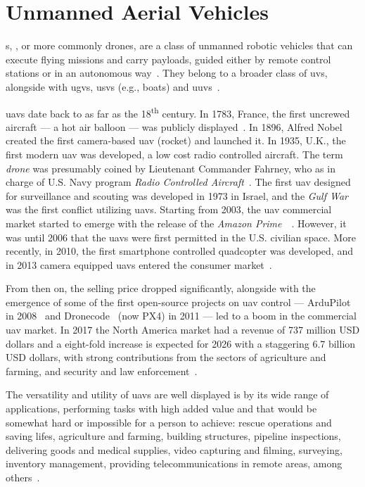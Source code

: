 \section{Unmanned Aerial Vehicles}%
\label{sec:unmann-aeri-vehicl}
s, , or more commonly drones, are a class of
unmanned robotic vehicles that can execute flying missions and carry payloads,
guided either by remote control stations or in an autonomous
way~\cite{alladi2022UAVBlockain,glossner2021overview}.
They belong to a broader class of \glspl{uv}, alongside with \glspl{ugv}, \glspl{usv}
(e.g., boats) and \glspl{uuv}~\cite{glossner2021overview}.

\glspl{uav} date back to as far as the 18\textsuperscript{th} century. In 1783,
France, the first uncrewed aircraft --- a hot air balloon ---
was publicly displayed~\cite{Blundell2020,alladi2022UAVBlockain}. In 1896, Alfred Nobel created the first camera-based \gls{uav}
(rocket) and launched it. In 1935, U.K., the first modern \gls{uav} was
developed, a low cost radio controlled aircraft. The term \emph{drone} was
presumably coined by Lieutenant Commander Fahrney, who as in charge of U.S. Navy
program \emph{Radio Controlled Aircraft}~\cite{Blundell2020}. The first \gls{uav} designed for
surveillance and scouting was developed in 1973 in Israel, and the \emph{Gulf
  War} was the first conflict utilizing \glspl{uav}. Starting from 2003,
the \gls{uav} commercial market started to emerge with the release of the
\emph{Amazon Prime}~~\cite{alladi2022UAVBlockain}.
However, it was until 2006 that the \glspl{uav} were first
permitted in the U.S. civilian space. More recently, in 2010, the first
smartphone controlled quadcopter was developed, and in 2013 camera equipped
\glspl{uav} entered the consumer market~\cite{uavHistory}.

From then on, the selling price dropped significantly, alongside with the
emergence of some of the first open-source projects on \gls{uav} control ---
ArduPilot in 2008~\cite{arduPilotHistory} and Dronecode~\cite{px4History} (now PX4) in 2011 --- led to a boom in the
commercial \gls{uav} market. In 2017 the North America market had a revenue of
737 million USD dollars and a eight-fold increase is expected for 2026 with a
staggering 6.7 billion USD dollars, with strong contributions from the sectors
of agriculture and farming, and security and law enforcement~\cite{mohsan2022towards}.

The versatility and utility of \glspl{uav} are well displayed is by its wide
range of applications, performing tasks with high added value and that would be
somewhat hard or impossible for a person to achieve: rescue operations and
saving lifes, agriculture and farming, building structures, pipeline
inspections, delivering goods and medical supplies, video capturing and filming,
surveying, inventory management, providing telecommunications in remote areas,
among others~\cite{alladi2022UAVBlockain}.

